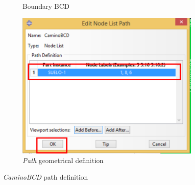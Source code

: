 \begin{itemize}
\begin{figure}[!h]
\begin{subfigure}[!h]{0.07\textwidth}
      \caption{Boundary BCD}
      \label{post29}
    \end{subfigure}\quad%
    \begin{subfigure}[!h]{0.60\textwidth}
      \includegraphics[width=\textwidth]{./body/images/post30.pdf}
      \caption{\textit{Path} geometrical definition}
      \label{post30}
    \end{subfigure}%
    \caption{\textit{CaminoBCD} path definition}
  \end{figure}


\end{itemize}
